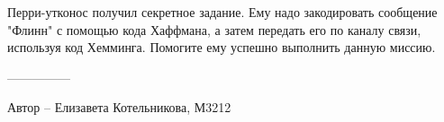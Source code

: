 \question
Перри-утконос получил секретное задание. Ему надо закодировать сообщение "Флинн" с помощью кода Хаффмана, а затем передать его по каналу связи, используя код Хемминга. Помогите ему успешно выполнить данную миссию.

---------------

Автор -- Елизавета Котельникова, М3212